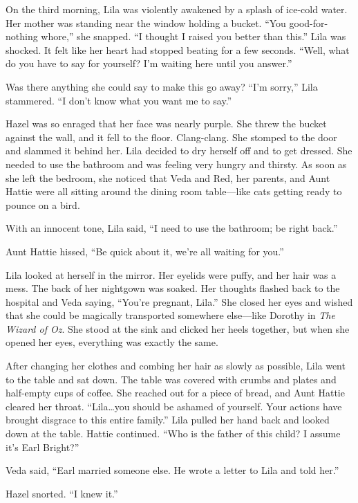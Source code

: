 \documentclass[
  american,
  letterpaper,
]{book}
\begin{document}
On the third morning, Lila was violently awakened by a splash of
ice-cold water. Her mother was standing near the window holding a
bucket. ``You good-for-nothing whore,'' she snapped. ``I thought I
raised you better than this.'' Lila was shocked. It felt like her heart
had stopped beating for a few seconds. ``Well, what do you have to say
for yourself? I'm waiting here until you answer.''

Was there anything she could say to make this go away? ``I'm sorry,''
Lila stammered. ``I don't know what you want me to say.''

Hazel was so enraged that her face was nearly purple. She threw the
bucket against the wall, and it fell to the floor. Clang-clang. She
stomped to the door and slammed it behind her. Lila decided to dry
herself off and to get dressed. She needed to use the bathroom and was
feeling very hungry and thirsty. As soon as she left the bedroom, she
noticed that Veda and Red, her parents, and Aunt Hattie were all sitting
around the dining room table---like cats getting ready to pounce on a
bird.

With an innocent tone, Lila said, ``I need to use the bathroom; be right
back.''

Aunt Hattie hissed, ``Be quick about it, we're all waiting for you.''

Lila looked at herself in the mirror. Her eyelids were puffy, and her
hair was a mess. The back of her nightgown was soaked. Her thoughts
flashed back to the hospital and Veda saying, ``You're pregnant, Lila.''
She closed her eyes and wished that she could be magically transported
somewhere else---like Dorothy in \emph{The Wizard of Oz}. She stood at
the sink and clicked her heels together, but when she opened her eyes,
everything was exactly the same.

After changing her clothes and combing her hair as slowly as possible,
Lila went to the table and sat down. The table was covered with crumbs
and plates and half-empty cups of coffee. She reached out for a piece of
bread, and Aunt Hattie cleared her throat. ``Lila\ldots you should be
ashamed of yourself. Your actions have brought disgrace to this entire
family.'' Lila pulled her hand back and looked down at the table. Hattie
continued. ``Who is the father of this child? I assume it's Earl
Bright?''

Veda said, ``Earl married someone else. He wrote a letter to Lila and
told her.''

Hazel snorted. ``I knew it.''
\end{document}
